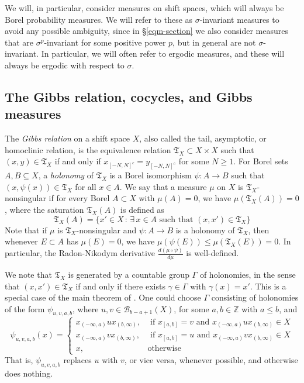 \documentclass{amsproc}
\numberwithin{theorem}{section}
\theoremstyle{remark}
\theoremstyle{definition}
\newcommand{\cB}{\mathcal{B}}
\newcommand{\fT}{\mathfrak{T}}
\theoremstyle{plain}
\begin{document}
We will, in particular, consider measures on shift spaces, which will always be Borel probability measures. We will refer to these as $\sigma$-invariant measures to avoid any possible ambiguity, since in \S \ref{eqm-section} we also consider measures that are $\sigma^p$-invariant for some positive power $p$, but in general are not $\sigma$-invariant. In particular, we will often refer to ergodic measures, and these will always be ergodic with respect to $\sigma$.


\subsection{The Gibbs relation, cocycles, and Gibbs measures}\label{gibbs-subsec}

The \textit{Gibbs relation} on a shift space $X$, also called the tail, asymptotic, or homoclinic relation, is the equivalence relation $\fT_X \subset X \times X$ such that $(x,y) \in \fT_X$ if and only if $x_{[-N,N]^c} = y_{[-N,N]^c}$ for some $N \geq 1$. For Borel sets $A, B \subseteq X$, a \textit{holonomy} of $\fT_X$ is a Borel isomorphism $\psi: A \to B$ such that $(x, \psi(x)) \in \fT_X$ for all $x \in A$. We say that a measure $\mu$ on $X$ is $\fT_X$-nonsingular if for every Borel $A \subset X$ with $\mu(A) = 0$, we have $\mu(\fT_X(A)) = 0$, where the saturation $\fT_X(A)$ is defined as 
\[
\fT_X(A) = \{ x' \in X \, : \, \exists \, x \in A \text{ such that } (x,x') \in \fT_X      \}
\]
Note that if $\mu$ is $\fT_X$-nonsingular and $\psi: A \to B$ is a holonomy of $\fT_X$, then whenever $E \subset A$ has $\mu(E) = 0$, we have $\mu(\psi(E)) \leq \mu(\fT_X(E)) = 0$. In particular, the Radon-Nikodym derivative $\frac{d(\mu \circ \psi)}{d\mu}$ is well-defined. 

We note that $\fT_{X}$ is generated by a countable group $\Gamma$ of holonomies, in the sense that $(x,x') \in \fT_{X}$ if and only if there exists $\gamma \in \Gamma$ with $\gamma(x) = x'$. This is a special case of the main theorem of \cite{feldman-moore-1977-equivalence}. One could choose $\Gamma$ consisting of holonomies of the form $\psi_{u,v, a, b}$, where $u,v \in \cB_{b-a + 1}(X)$, for some $a, b \in \mathbb{Z}$ with $a \leq b$, and
\[
\psi_{u,v, a, b}(x) = 
\begin{cases}
x_{(-\infty, a)} u x_{(b, \infty)}, & \text{ if } x_{[a,b]} = v \text{ and }  x_{(-\infty, a)} u x_{(b, \infty)} \in X \\
%
x_{(-\infty, a)} v x_{(b, \infty)}, & \text{ if } x_{[a,b]} = u \text{ and }  x_{(-\infty, a)} v x_{(b, \infty)} \in X \\
%
x, & \text{otherwise}
\end{cases}
\] 
That is, $\psi_{u,v, a, b}$ replaces $u$ with $v$, or vice versa, whenever possible, and otherwise does nothing.
\end{document}
